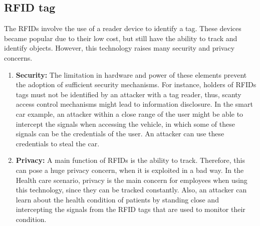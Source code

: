 \documentclass{llncs}
\begin{document}
\subsection{RFID tag}
The RFIDs involve the use of a reader device to identify a tag. These devices became popular due to their low cost, but still have the ability to track and identify objects. However, this technology raises many security and privacy concerns\cite{Molnar2004,Lehtonen2007}.
\begin{enumerate} 
\item \textbf{Security:} The limitation in hardware and power of these elements prevent the adoption of sufficient security mechanisms\cite{Weis2004,Rotter2008}. For instance, holders of RFIDs tags must not be identified by an attacker with a tag reader, thus, scanty access control mechanisms might lead to information disclosure\cite{Lehtonen2007}.  In the smart car example, an attacker within a close range of the user might be able to intercept the signals when accessing the vehicle, in which some of these signals can be the credentials of the user. An attacker can use these credentials to steal the car. 
\item \textbf{Privacy:} A main function of RFIDs is the ability to track. Therefore, this can pose a huge privacy concern, when it is exploited in a bad way\cite{Gudymenko2012}. In the Health care scenario, privacy is the main concern for employees when using this technology, since they can be tracked constantly. Also, an attacker can learn about the health condition of patients by standing close and intercepting the signals from the RFID tags\cite{Abie2012} that are used to monitor their condition.
\end{enumerate}
\end{document}
